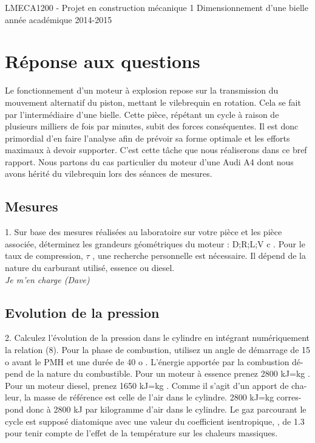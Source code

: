 \documentclass[a4paper,oneside,12pt]{report}
\begin{document}
\begin{titlepage}

LMECA1200 - Projet en construction mécanique 1
Dimensionnement d’une bielle
année académique 2014-2015

\end{titlepage}

\section{Réponse aux questions}

Le fonctionnement d'un moteur à explosion repose sur la transmission du mouvement alternatif du piston, mettant le vilebrequin en rotation. Cela se fait par l'intermédiaire d'une bielle. Cette pièce, répétant un cycle à raison de plusieurs milliers de fois par minutes, subit des forces conséquentes. Il est donc primordial d'en faire l'analyse afin de prévoir sa forme optimale et les efforts maximaux à devoir supporter. C'est cette tâche que nous réaliserons dans ce bref rapport. Nous partons du cas particulier du moteur d'une Audi A4 dont nous avons hérité du vilebrequin lors des séances de mesures.

\subsection{Mesures}
1. Sur base des mesures réalisées au laboratoire sur votre pièce et les pièce associée,
déterminez les grandeurs géométriques du moteur :
D;R;L;V
c
. Pour le taux de
compression,
$\tau$
, une recherche personnelle est nécessaire. Il dépend de la nature
du carburant utilisé, essence ou diesel.\\

\textit{Je m'en charge (Dave)}

\subsection{Evolution de la pression}
2. Calculez l’évolution de la pression dans le cylindre en intégrant numériquement
la relation (8). Pour la phase de combustion, utilisez un angle de démarrage de
15
o
avant le PMH et une durée de
40
o
. L’énergie apportée par la combustion dé-
pend de la nature du combustible. Pour un moteur à essence prenez
2800
kJ=kg
.
Pour un moteur diesel, prenez
1650
kJ=kg
. Comme il s’agit d’un apport de cha-
leur, la masse de référence est celle de l’air dans le cylindre.
2800
kJ=kg
corres-
pond donc à
2800
kJ
par kilogramme d’air dans le cylindre. Le gaz parcourant
le cycle est supposé diatomique avec une valeur du coefficient isentropique,
,
de 1.3 pour tenir compte de l’effet de la température sur les chaleurs massiques.
\end{document}
